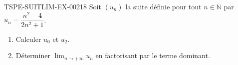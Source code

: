 \begin{exercice}{TSPE-SUITLIM-EX-002}{1}{8}
Soit $(u_n)$ la suite définie pour tout $n \in \mathbb{N}$ par $u_n = \dfrac{n^2 - 4}{2n^2 + 1}$.
\begin{enumerate}
  \item Calculer $u_0$ et $u_2$.
  \item Déterminer $\lim_{n \to +\infty} u_n$ en factorisant par le terme dominant.
\end{enumerate}
\end{exercice}

